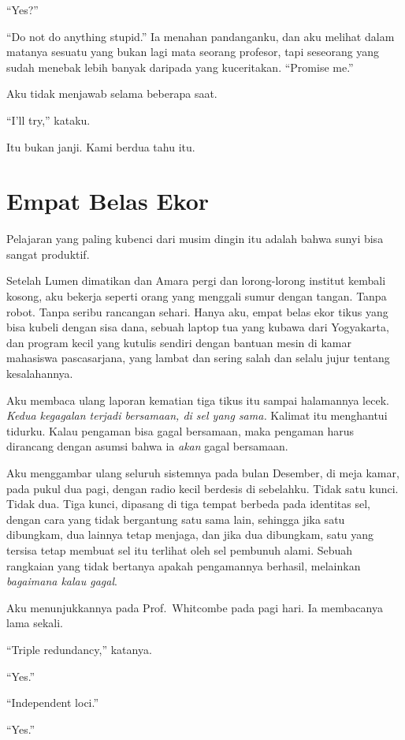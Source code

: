 \documentclass[11pt,twoside,openany]{book}
\begin{document}
``Yes?''

``Do not do anything stupid.'' Ia menahan pandanganku, dan aku melihat dalam matanya sesuatu yang bukan lagi mata seorang profesor, tapi seseorang yang sudah menebak lebih banyak daripada yang kuceritakan. ``Promise me.''

Aku tidak menjawab selama beberapa saat.

``I'll try,'' kataku.

Itu bukan janji. Kami berdua tahu itu.

\chapter{Empat Belas Ekor}
Pelajaran yang paling kubenci dari musim dingin itu adalah bahwa sunyi bisa sangat produktif.

Setelah Lumen dimatikan dan Amara pergi dan lorong-lorong institut kembali kosong, aku bekerja seperti orang yang menggali sumur dengan tangan. Tanpa robot. Tanpa seribu rancangan sehari. Hanya aku, empat belas ekor tikus yang bisa kubeli dengan sisa dana, sebuah laptop tua yang kubawa dari Yogyakarta, dan program kecil yang kutulis sendiri dengan bantuan mesin di kamar mahasiswa pascasarjana, yang lambat dan sering salah dan selalu jujur tentang kesalahannya.

Aku membaca ulang laporan kematian tiga tikus itu sampai halamannya lecek. \emph{Kedua kegagalan terjadi bersamaan, di sel yang sama.} Kalimat itu menghantui tidurku. Kalau pengaman bisa gagal bersamaan, maka pengaman harus dirancang dengan asumsi bahwa ia \emph{akan} gagal bersamaan.

Aku menggambar ulang seluruh sistemnya pada bulan Desember, di meja kamar, pada pukul dua pagi, dengan radio kecil berdesis di sebelahku. Tidak satu kunci. Tidak dua. Tiga kunci, dipasang di tiga tempat berbeda pada identitas sel, dengan cara yang tidak bergantung satu sama lain, sehingga jika satu dibungkam, dua lainnya tetap menjaga, dan jika dua dibungkam, satu yang tersisa tetap membuat sel itu terlihat oleh sel pembunuh alami. Sebuah rangkaian yang tidak bertanya apakah pengamannya berhasil, melainkan \emph{bagaimana kalau gagal}.

Aku menunjukkannya pada Prof.~Whitcombe pada pagi hari. Ia membacanya lama sekali.

``Triple redundancy,'' katanya.

``Yes.''

``Independent loci.''

``Yes.''
\end{document}
